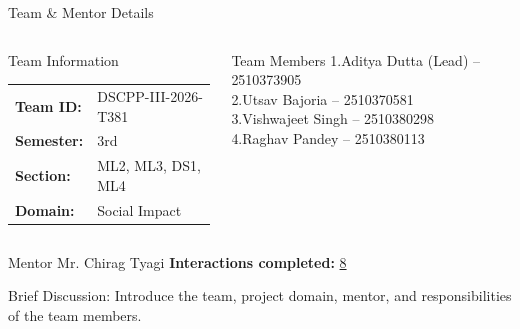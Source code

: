 \documentclass[aspectratio=169,11pt]{beamer}
\newcommand{\smallnote}[1]{%
\vspace{0.08cm}
{\scriptsize\color{GEUGrey}#1}
}
\begin{document}
\begin{frame}{Team \& Mentor Details}

\begin{columns}[T,totalwidth=\textwidth]


\begin{block}{Team Information}
\begin{tabular}{@{}ll@{}}
\textbf{Team ID:} & DSCPP-III-2026-T381\\
\textbf{Semester:} & 3rd\\
\textbf{Section:} & ML2, ML3, DS1, ML4\\
\textbf{Domain:} & Social Impact
\end{tabular}
\end{block}


\begin{block}{Team Members}
1.\quad Aditya Dutta (Lead) -- 2510373905\\
2.\quad Utsav Bajoria -- 2510370581\\
3.\quad Vishwajeet Singh -- 2510380298\\
4.\quad Raghav Pandey -- 2510380113
\end{block}

\end{columns}

\vspace{2mm}

\begin{block}{Mentor}
Mr. Chirag Tyagi
\hfill
\textbf{Interactions completed:}
\underline 8 {\hspace{12mm}}
\end{block}

\vfill

\smallnote{
Brief Discussion: Introduce the team, project domain, mentor,
and responsibilities of the team members.
}

\end{frame}
\end{document}
